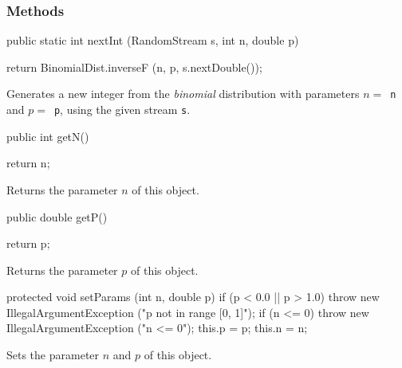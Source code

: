 \subsubsection* {Methods}
\begin{code}

   public static int nextInt (RandomStream s, int n, double p)\begin{hide} {
      return BinomialDist.inverseF (n, p, s.nextDouble());
   }\end{hide}
\end{code}
\begin{tabb}
   Generates a new integer from the {\em binomial\/} distribution with
  parameters
   $n = $~\texttt{n} and $p = $~\texttt{p}, using the given stream \texttt{s}.
\end{tabb}
\begin{code}

   public int getN()\begin{hide} {
      return n;
   }
   \end{hide}
\end{code}
\begin{tabb} Returns the parameter $n$ of this object.
\end{tabb}
\begin{code}

   public double getP()\begin{hide} {
      return p;
   }
   \end{hide}
\end{code}
\begin{tabb} Returns the parameter $p$ of this object.
\end{tabb}
\begin{hide}\begin{code}

   protected void setParams (int n, double p) {
      if (p < 0.0 || p > 1.0)
         throw new IllegalArgumentException ("p not in range [0, 1]");
      if (n <= 0)
         throw new IllegalArgumentException ("n <= 0");
      this.p = p;
      this.n = n;
   }
\end{code}
\begin{tabb} Sets the parameter $n$ and $p$ of this object.
\end{tabb}
\begin{code}
}
\end{code}
\end{hide}

